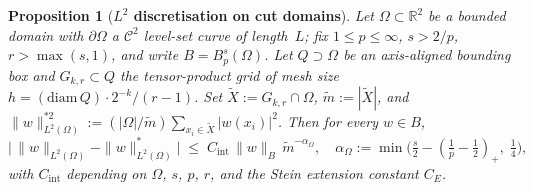 \documentclass[11pt]{article}
\newtheorem{proposition}[theorem]{Proposition}
\newcommand{\C}{\mathcal{C}}
\begin{document}
\begin{proposition}[\textbf{$L^2$ discretisation on cut domains}]
\label{prop:l2_cut}
Let $\Omega\subset\mathbb{R}^2$ be a bounded domain with
$\partial\Omega$ a $\C^2$ level-set curve of length~$L$; fix
$1\le p\le\infty$, $s>2/p$, $r>\max(s,1)$, and write
$B=B^s_p(\Omega)$. Let $Q\supset\Omega$ be an axis-aligned bounding
box and $G_{k,r}\subset Q$ the tensor-product grid of mesh size
$h=(\mathrm{diam}\,Q)\cdot 2^{-k}/(r-1)$. Set
$\tilde{X}:=G_{k,r}\cap\Omega$, $\tilde{m}:=|\tilde{X}|$, and
$\|w\|^{*2}_{L^2(\Omega)}:=(|\Omega|/\tilde{m})\sum_{x_i\in\tilde{X}}|w(x_i)|^2$.
Then for every $w\in B$,
\begin{equation}\label{eq:prop3}
  \bigl|\,\|w\|_{L^2(\Omega)}-\|w\|^*_{L^2(\Omega)}\bigr|
  \;\le\; C_{\mathrm{int}}\,\|w\|_B\,\tilde{m}^{-\alpha_\Omega},
  \quad
  \alpha_\Omega
  := \min\!\bigl(\tfrac{s}{2}
    -(\tfrac{1}{p}-\tfrac{1}{2})_+,\;\tfrac{1}{4}\bigr),
\end{equation}
with $C_{\mathrm{int}}$ depending on $\Omega$, $s$, $p$, $r$, and the
Stein extension constant $C_E$.
\end{proposition}
 
\end{document}
